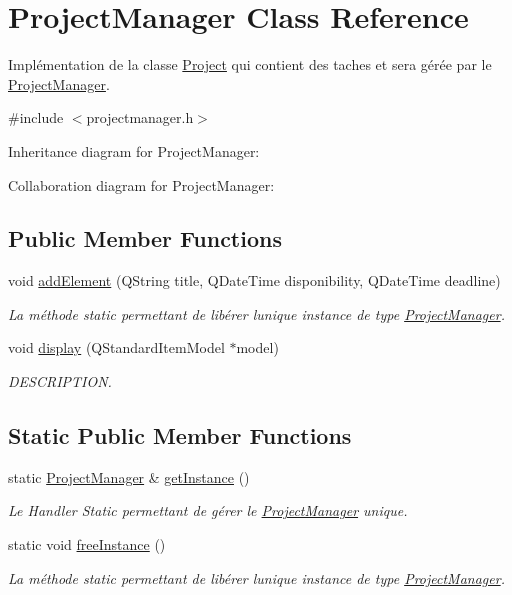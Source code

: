 \hypertarget{class_project_manager}{}\section{Project\+Manager Class Reference}
\label{class_project_manager}


Implémentation de la classe \hyperlink{class_project}{Project} qui contient des taches et sera gérée par le \hyperlink{class_project_manager}{Project\+Manager}.  




{\ttfamily \#include $<$projectmanager.\+h$>$}



Inheritance diagram for Project\+Manager\+:


Collaboration diagram for Project\+Manager\+:
\subsection*{Public Member Functions}
\begin{DoxyCompactItemize}
\item 
void \hyperlink{class_project_manager_aec73d7c6f6862c50d0a276bbe5a95833}{add\+Element} (Q\+String title, Q\+Date\+Time disponibility, Q\+Date\+Time deadline)
\begin{DoxyCompactList}\small\item\em La méthode static permettant de libérer l\textquotesingle{}unique instance de type \hyperlink{class_project_manager}{Project\+Manager}. \end{DoxyCompactList}\item 
void \hyperlink{class_project_manager_aeeb5a2052171bfc03949acfa6a6dd3e0}{display} (Q\+Standard\+Item\+Model $\ast$model)
\begin{DoxyCompactList}\small\item\em D\+E\+S\+C\+R\+I\+P\+T\+I\+O\+N. \end{DoxyCompactList}\end{DoxyCompactItemize}
\subsection*{Static Public Member Functions}
\begin{DoxyCompactItemize}
\item 
static \hyperlink{class_project_manager}{Project\+Manager} \& \hyperlink{class_project_manager_a902ef9b3faae48a7445a85d05ba57ad7}{get\+Instance} ()
\begin{DoxyCompactList}\small\item\em Le Handler Static permettant de gérer le \hyperlink{class_project_manager}{Project\+Manager} unique. \end{DoxyCompactList}\item 
static void \hyperlink{class_project_manager_af9dda837b0c96ec9a72abeec380cdbff}{free\+Instance} ()
\begin{DoxyCompactList}\small\item\em La méthode static permettant de libérer l\textquotesingle{}unique instance de type \hyperlink{class_project_manager}{Project\+Manager}. \end{DoxyCompactList}\end{DoxyCompactItemize}
